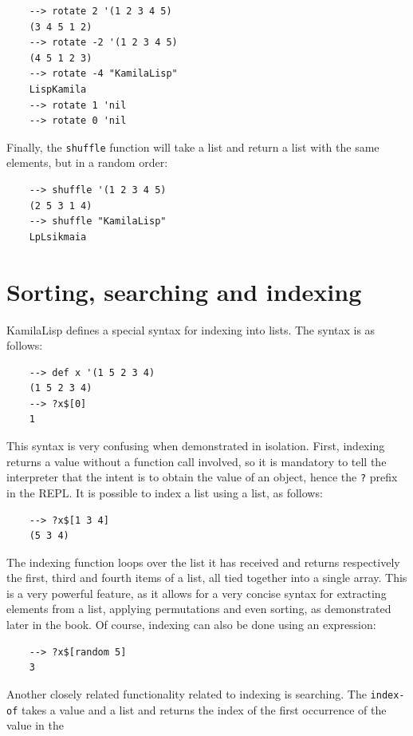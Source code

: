 \begin{Verbatim}
    --> rotate 2 '(1 2 3 4 5)
    (3 4 5 1 2)
    --> rotate -2 '(1 2 3 4 5)
    (4 5 1 2 3)
    --> rotate -4 "KamilaLisp"
    LispKamila
    --> rotate 1 'nil
    --> rotate 0 'nil
\end{Verbatim}

Finally, the \verb|shuffle| function will take a list and return a list with the same elements, but in a random order:

\begin{Verbatim}
    --> shuffle '(1 2 3 4 5)
    (2 5 3 1 4)
    --> shuffle "KamilaLisp"
    LpLsikmaia
\end{Verbatim}

\section{Sorting, searching and indexing}

KamilaLisp defines a special syntax for indexing into lists. The syntax is as follows:

\begin{Verbatim}
    --> def x '(1 5 2 3 4)
    (1 5 2 3 4)
    --> ?x$[0]
    1
\end{Verbatim}

This syntax is very confusing when demonstrated in isolation. First, indexing returns a value without a function call involved, so it is mandatory to tell the interpreter that the intent is to obtain the value of an object, hence the \verb|?| prefix in the REPL. It is possible to index a list using a list, as follows:

\begin{Verbatim}
    --> ?x$[1 3 4]
    (5 3 4)
\end{Verbatim}

The indexing function loops over the list it has received and returns respectively the first, third and fourth items of a list, all tied together into a single array. This is a very powerful feature, as it allows for a very concise syntax for extracting elements from a list, applying permutations and even sorting, as demonstrated later in the book. Of course, indexing can also be done using an expression:

\begin{Verbatim}
    --> ?x$[random 5]
    3
\end{Verbatim}

Another closely related functionality related to indexing is searching. The \verb|index-of| takes a value and a list and returns the index of the first occurrence of the value in the 

